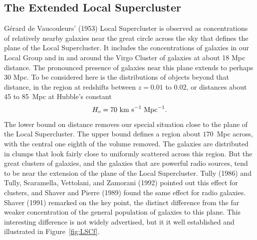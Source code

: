 \documentclass[fleqn,12pt]{article}
\newcommand{\beq}{\begin{equation}}
\newcommand{\eeq}{\end{equation}}
\begin{document}
\subsection{The Extended Local Supercluster}\label{sec:LSC} 

G\'erard de Vaucouleurs' (1953) Local Supercluster is observed as concentrations of relatively nearby galaxies near the great circle across the sky that defines the plane of the Local Supercluster. It includes the concentrations of galaxies in our Local Group and in and around the Virgo Cluster of galaxies at about 18 Mpc distance. The pronounced presence of galaxies near this plane extends to perhaps 30 Mpc. To be considered here is the distributions of objects beyond that distance, in the region at redshifts between $z=0.01$ to 0.02, or distances about 45 to 85~Mpc at Hubble's constant
\beq
H_{\rm o} = 70\hbox{ km s}^{-1}\hbox{ Mpc}^{-1}.
\eeq 
The lower bound on distance removes our special situation close to the plane of the Local Supercluster. The upper bound defines a region about $170$~Mpc across, with the central one eighth of the volume removed. The galaxies are distributed in clumps that look fairly close to uniformly scattered across this region. But the great clusters of galaxies, and the galaxies that are powerful radio sources, tend to be near the extension of the plane of the Local Supercluster. Tully (1986) and Tully, Scaramella, Vettolani, and Zamorani (1992) pointed out this effect for clusters, and Shaver and Pierre (1989) found the same effect for radio galaxies. Shaver (1991) remarked on the key point, the distinct difference from the far weaker concentration of the general population of galaxies to this plane. This interesting difference is not widely advertised, but it it well established and illustrated in Figure~\ref{fig:LSCf}. 
\end{document}
